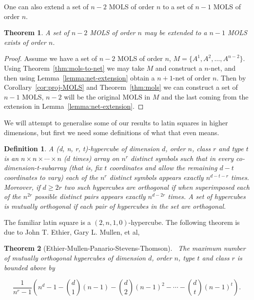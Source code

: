 \documentclass{article}
\newtheorem{theorem}{Theorem}
\newtheorem{definition}{Definition}
\begin{document}
      One can also extend a set of \(n - 2\) MOLS of order \(n\) to a set of \(n - 1\) MOLS of order \(n\).

      \begin{theorem}
        A set of \(n - 2\) MOLS of order \(n\) may be extended to a \(n - 1\) MOLS exists of order \(n\).
      \end{theorem}

      \begin{proof}
        Assume we have a set of \(n - 2\) MOLS of order \(n\), \(M = \{A^{1}, A^{2}, \ldots, A^{n - 2}\}\). Using Theorem~\ref{thm:mols-to-net} we may take \(M\) and construct a \(n\)-net, and then using Lemma~\ref{lemma:net-extension} obtain a \(n + 1\)-net of order \(n\). Then by Corollary~\ref{cor:proj-MOLS} and Theorem~\ref{thm:mols} we can construct a set of \(n - 1\) MOLS, \(n - 2\) will be the original MOLS in \(M\) and the last coming from the extension in Lemma~\ref{lemma:net-extension}.
      \end{proof}


      We will attempt to generalise some of our results to latin squares in higher dimensions, but first we need some definitions of what that even means.
    \begin{definition}\label{def:hypercube}
        A (d, n, r, t)-hypercube of dimension \(d\), order \(n\), class \(r\) and type \(t\) is an \(n \times n \times \cdots \times n\) (\(d\) times) array on \(n^r\) distinct symbols such that in every co-dimension-t-subarray (that is, fix \(t\) coordinates and allow the remaining \(d - t\) coordinates to vary) each of the \(n^r\)
        distinct symbols appears exactly \(n^{d - t - r}\) times.
        Moreover, if \(d \geq 2r\) two such hypercubes are \textit{orthogonal} if when superimposed each of the \(n^{2r}\) possible distinct pairs appears exactly \(n^{d - 2r}\) times. A set of hypercubes is mutually orthogonal if each pair of hypercubes in the set are orthogonal.
    \end{definition}

    The familiar latin square is a \((2, n, 1, 0)\)-hypercube. The following theorem is due to John T. Ethier, Gary L. Mullen, et al,

    \begin{theorem}[Ethier-Mullen-Panario-Stevens-Thomson]~\label{thm:mut-ortho}
        The maximum number of mutually orthogonal hypercubes of dimension \(d\), order \(n\), type \(t\) and class \(r\) is bounded above by

        \begin{equation*}
            \frac{1}{n^r - 1}\left(n^d - 1 - \binom{d}{1}(n - 1) - \binom{d}{2}{(n - 1)}^2 - \cdots - \binom{d}{t} {(n - 1)}^t\right).
        \end{equation*}

    \end{theorem}
\end{document}
